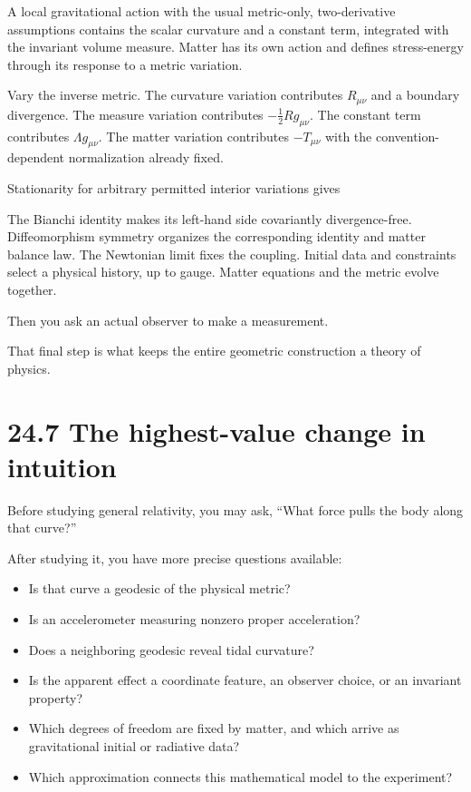 \documentclass[
  11pt,
  letterpaper,
  oneside,
  openany]{scrbook}
\providecommand{\tightlist}{%
  \setlength{\itemsep}{0pt}\setlength{\parskip}{0pt}}
\begin{document}
A local gravitational action with the usual metric-only, two-derivative
assumptions contains the scalar curvature and a constant term,
integrated with the invariant volume measure. Matter has its own action
and defines stress-energy through its response to a metric variation.

Vary the inverse metric. The curvature variation contributes
\(R_{\mu\nu}\) and a boundary divergence. The measure variation
contributes \(-\tfrac12Rg_{\mu\nu}\). The constant term contributes
\(\Lambda g_{\mu\nu}\). The matter variation contributes \(-T_{\mu\nu}\)
with the convention-dependent normalization already fixed.

Stationarity for arbitrary permitted interior variations gives

\begin{center}
\begingroup
{}
\ifdim\wd\grmathbox>\linewidth
\resizebox{\linewidth}{!}{\usebox{\grmathbox}}
\else\usebox{\grmathbox}\fi
\endgroup
\end{center}

The Bianchi identity makes its left-hand side covariantly
divergence-free. Diffeomorphism symmetry organizes the corresponding
identity and matter balance law. The Newtonian limit fixes the coupling.
Initial data and constraints select a physical history, up to gauge.
Matter equations and the metric evolve together.

Then you ask an actual observer to make a measurement.

That final step is what keeps the entire geometric construction a theory
of physics.

\hypertarget{the-highest-value-change-in-intuition}{%
\section{24.7 The highest-value change in
intuition}\label{the-highest-value-change-in-intuition}}

Before studying general relativity, you may ask, ``What force pulls the
body along that curve?''

After studying it, you have more precise questions available:

\begin{itemize}
\tightlist
\item
  Is that curve a geodesic of the physical metric?
\item
  Is an accelerometer measuring nonzero proper acceleration?
\item
  Does a neighboring geodesic reveal tidal curvature?
\item
  Is the apparent effect a coordinate feature, an observer choice, or an
  invariant property?
\item
  Which degrees of freedom are fixed by matter, and which arrive as
  gravitational initial or radiative data?
\item
  Which approximation connects this mathematical model to the
  experiment?
\end{itemize}
\end{document}
